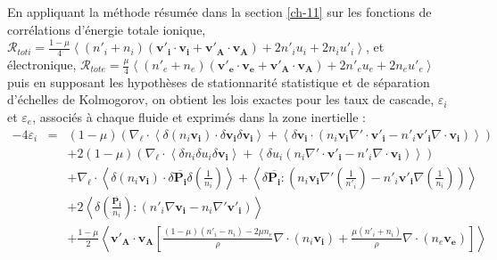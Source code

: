 En appliquant la méthode résumée dans la section \ref{ch-11} sur les fonctions de corrélations d'énergie totale ionique, $\mathcal{R}_{tot i} = \frac{1-\mu}{4} \left<  (n'_i + n_i) (\boldsymbol{v'_i} \cdot \boldsymbol{v_i} + \boldsymbol{v'_A} \cdot \boldsymbol{v_A}) + 2 n'_i u_i + 2 n_i u'_i \right>$, et électronique,  $ \mathcal{R}_{tot e} = \frac{\mu}{4} \left<  (n'_e + n_e) (\boldsymbol{v'_e} \cdot \boldsymbol{v_e} + \boldsymbol{v'_A} \cdot \boldsymbol{v_A}) + 2 n'_e u_e + 2 n_e u'_e \right> $ puis en supposant les hypothèses de stationnarité statistique et de séparation d'échelles de Kolmogorov, on obtient les lois exactes pour les taux de cascade, $\varepsilon_i$ et $\varepsilon_e$, associés à chaque fluide et exprimés dans la zone inertielle  :
\begin{eqnarray}
  \label{eq:turb_bi_Ri} -4 \varepsilon_i &=& \left(1-\mu\right)\left( \nabla_{\boldsymbol{\ell}} \cdot\left<  \delta \left(n_i \boldsymbol{v_i}\right) \cdot \delta \boldsymbol{v_i}\delta \boldsymbol{v_i} \right> +\left<\delta \boldsymbol{v_i}\cdot \left(n_i \boldsymbol{v_i}   \nabla' \cdot \boldsymbol{v'_i}- n'_i \boldsymbol{v'_i} \nabla \cdot \boldsymbol{v_i}\right)\right>\right)  \nonumber\\ %
  &&+ 2  \left(1-\mu\right) \left(\nabla_{\boldsymbol{\ell}} \cdot\left<  \delta n_i  \delta u_i\delta \boldsymbol{v_i} \right> +\left<\delta u_i  \left(n_i \nabla' \cdot \boldsymbol{v'_i}- n'_i \nabla \cdot \boldsymbol{v_i}\right)\right> \right) \nonumber\\ %
  &&+ \nabla_{\boldsymbol{\ell}} \cdot\left<  \delta \left(n_i \boldsymbol{v_i}\right) \cdot \delta \overline{\boldsymbol{P_i}} \delta \left(\frac{1}{n_i}\right)\right> + \left<\delta \overline{\boldsymbol{P_i}} : \left(n_i \boldsymbol{v_i}  \nabla' \left(\frac{1}{n'_i}\right) - n'_i \boldsymbol{v'_i} \nabla \left(\frac{1}{n_i}\right)\right)\right> \nonumber \\ %
  &&+ 2 \left<\delta \left(\frac{\overline{\boldsymbol{P_i}}}{n_i}\right) : \left(n'_i \nabla\boldsymbol{v_i} - n_i \nabla' \boldsymbol{v'_i}\right) \right> \nonumber \\ %
  &&+\frac{1-\mu}{2} \left<  \boldsymbol{v'_A} \cdot \boldsymbol{v_{A}}  \left[ \frac{\left(1-\mu\right)\left(n'_i - n_i\right) -2 \mu n_e }{\rho}\nabla \cdot \left(n_i \boldsymbol{v_i}\right)+  \frac{\mu \left(n'_i + n_i\right)}{\rho}  \nabla \cdot \left(n_e \boldsymbol{v_e}\right)  \right] \right> \nonumber\\ %

\end{eqnarray}
